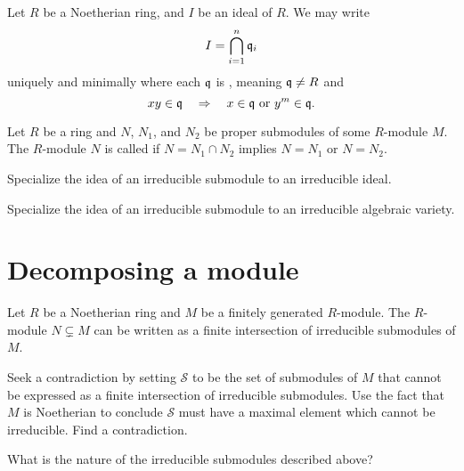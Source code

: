 \documentclass{ximera}
\begin{document}
\begin{theorem}
  Let $R$ be a Noetherian ring, and $I$ be an ideal of $R$. We may write
  \[
  I = \bigcap_{i=1}^n \mathfrak{q}_i
  \]
  uniquely and minimally where each $\mathfrak{q}$ is , meaning $\mathfrak{q}\ne R$ and
  \[
  xy\in\mathfrak{q} \quad \Rightarrow \quad x\in\mathfrak{q}\text{ or }y^m\in\mathfrak{q}.
  \]
\end{theorem}





\begin{definition}
  Let $R$ be a ring and $N$, $N_1$, and $N_2$ be proper submodules of
  some $R$-module $M$. The $R$-module $N$ is called 
  if $N = N_1\cap N_2$ implies $N=N_1$ or $N=N_2$.
\end{definition}


\begin{exercise}
  Specialize the idea of an irreducible submodule to an irreducible
  ideal.
\end{exercise}

\begin{exercise}
  Specialize the idea of an irreducible submodule to an irreducible
  algebraic variety.
\end{exercise}




\section{Decomposing a module}



\begin{lemma}\label{L:irrdecomp}
  Let $R$ be a Noetherian ring and $M$ be a finitely generated
  $R$-module. The $R$-module $N\subsetneq M$ can be written as a finite
  intersection of irreducible submodules of $M$.
  \begin{sketch}
    Seek a contradiction by setting $\mathcal{S}$ to be the set of
    submodules of $M$ that cannot be expressed as a finite
    intersection of irreducible submodules. Use the fact that $M$ is
    Noetherian to conclude $\mathcal{S}$ must have a maximal element
    which cannot be irreducible. Find a contradiction.
  \end{sketch}
\end{lemma}

\begin{question}
What is the nature of the irreducible submodules described above?
\end{question}
\end{document}
